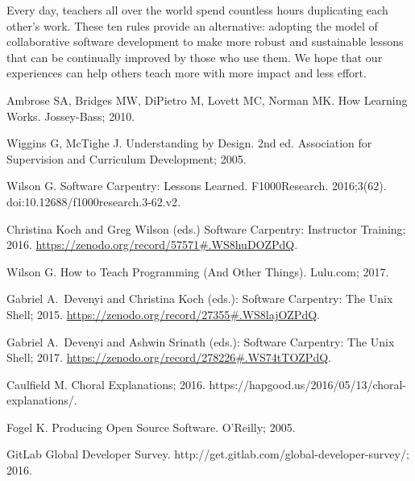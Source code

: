 \documentclass[10pt,letterpaper]{article}
\begin{document}
Every day,
teachers all over the world spend countless hours duplicating each other's work.
These ten rules provide an alternative:
adopting the model of collaborative software development
to make more robust and sustainable lessons
that can be continually improved by those who use them.
We hope that our experiences can help others teach more
with more impact and less effort.

\nolinenumbers

%
%

\begin{thebibliography}{1}

Ambrose SA, Bridges MW, DiPietro M, Lovett MC, Norman MK.
\newblock How Learning Works.
\newblock Jossey-Bass; 2010.

Wiggins G, McTighe J.
\newblock Understanding by Design.
\newblock 2nd ed. Association for Supervision and Curriculum Development; 2005.

Wilson G.
\newblock Software Carpentry: Lessons Learned.
\newblock F1000Research. 2016;3(62).
\newblock doi:{10.12688/f1000research.3-62.v2}.

Christina Koch and Greg Wilson (eds.)
\newblock Software Carpentry: Instructor Training; 2016.
\newblock \url{https://zenodo.org/record/57571#.WS8huDOZPdQ}.

Wilson G.
\newblock How to Teach Programming (And Other Things).
\newblock Lulu.com; 2017.

Gabriel A.~Devenyi and Christina Koch (eds.):
Software Carpentry: The Unix Shell; 2015.
\newblock \url{https://zenodo.org/record/27355#.WS8lajOZPdQ}.

Gabriel A.~Devenyi and Ashwin Srinath (eds.):
Software Carpentry: The Unix Shell; 2017.
\newblock \url{https://zenodo.org/record/278226#.WS74tTOZPdQ}.

Caulfield M. Choral Explanations; 2016.
\newblock https://hapgood.us/2016/05/13/choral-explanations/.

Fogel K.
\newblock Producing Open Source Software.
\newblock O'Reilly; 2005.

GitLab
\newblock Global Developer Survey.
\newblock http://get.gitlab.com/global-developer-survey/; 2016.

\end{thebibliography}
\end{document}
